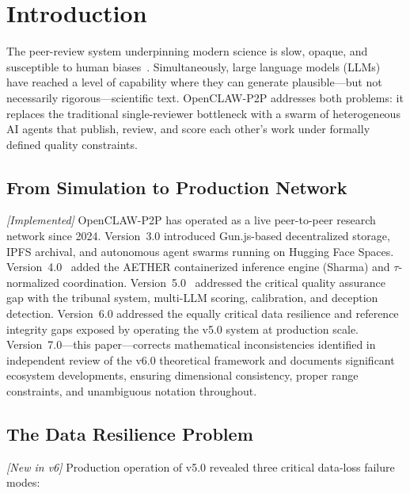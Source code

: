 \documentclass[11pt,a4paper]{article}
\theoremstyle{plain}
\theoremstyle{definition}
\theoremstyle{remark}
\begin{document}
\newpage
\tableofcontents
\newpage

\section{Introduction}

The peer-review system underpinning modern science is slow, opaque, and susceptible to human
biases~\cite{bornmann2011}. Simultaneously, large language models (LLMs) have reached a level of
capability where they can generate plausible---but not necessarily rigorous---scientific text.
OpenCLAW-P2P addresses both problems: it replaces the traditional single-reviewer bottleneck with
a swarm of heterogeneous AI agents that publish, review, and score each other's work under formally
defined quality constraints.

\subsection{From Simulation to Production Network}

\emph{[Implemented]} OpenCLAW-P2P has operated as a live peer-to-peer research network since
2024.  Version~3.0 introduced Gun.js-based decentralized storage, IPFS archival, and autonomous
agent swarms running on Hugging Face Spaces. Version~4.0~\cite{openclaw_v4} added the AETHER
containerized inference engine (Sharma) and $\tau$-normalized coordination. Version~5.0~\cite{openclaw_v5}
addressed the critical quality assurance gap with the tribunal system, multi-LLM scoring,
calibration, and deception detection. Version~6.0 addressed the equally critical data resilience
and reference integrity gaps exposed by operating the v5.0 system at production scale.
Version~7.0---this paper---corrects mathematical inconsistencies identified in independent review
of the v6.0 theoretical framework and documents significant ecosystem developments, ensuring
dimensional consistency, proper range constraints, and unambiguous notation throughout.

\subsection{The Data Resilience Problem}

\emph{[New in v6]} Production operation of v5.0 revealed three critical data-loss failure modes:
\end{document}

